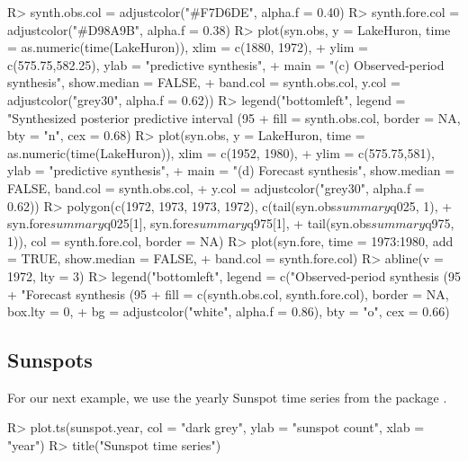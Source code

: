 \documentclass{jss}
\begin{document}
\begin{CodeChunk}
\begin{CodeInput}
R> synth.obs.col = adjustcolor("#F7D6DE", alpha.f = 0.40)
R> synth.fore.col = adjustcolor("#D98A9B", alpha.f = 0.38)
R> plot(syn.obs, y = LakeHuron, time = as.numeric(time(LakeHuron)), xlim = c(1880, 1972),
+         ylim = c(575.75,582.25), ylab = "predictive synthesis",
+         main = "(c) Observed-period synthesis", show.median = FALSE,
+         band.col = synth.obs.col, y.col = adjustcolor("grey30", alpha.f = 0.62))
R> legend("bottomleft", legend = "Synthesized posterior predictive interval (95%
+           fill = synth.obs.col, border = NA, bty = "n", cex = 0.68)
R> plot(syn.obs, y = LakeHuron, time = as.numeric(time(LakeHuron)), xlim = c(1952, 1980),
+         ylim = c(575.75,581), ylab = "predictive synthesis",
+         main = "(d) Forecast synthesis", show.median = FALSE, band.col = synth.obs.col,
+         y.col = adjustcolor("grey30", alpha.f = 0.62))
R> polygon(c(1972, 1973, 1973, 1972), c(tail(syn.obs$summary$q025, 1),
+         syn.fore$summary$q025[1], syn.fore$summary$q975[1],
+         tail(syn.obs$summary$q975, 1)), col = synth.fore.col, border = NA)
R> plot(syn.fore, time = 1973:1980, add = TRUE, show.median = FALSE,
+          band.col = synth.fore.col)
R> abline(v = 1972, lty = 3)
R> legend("bottomleft", legend = c("Observed-period synthesis (95%
+          "Forecast synthesis (95%
+       fill = c(synth.obs.col, synth.fore.col), border = NA, box.lty = 0, 
+       bg = adjustcolor("white", alpha.f = 0.86), bty = "o", cex = 0.66)
\end{CodeInput}
\end{CodeChunk}


\subsection{Sunspots}
\label{sec:ex2}

For our next example, we use the yearly Sunspot time series from the package . 

\begin{CodeChunk}
    \begin{CodeInput}
R> plot.ts(sunspot.year, col = "dark grey", ylab = "sunspot count", xlab = "year")
R> title("Sunspot time series")
    \end{CodeInput}
\end{CodeChunk}
\end{document}
